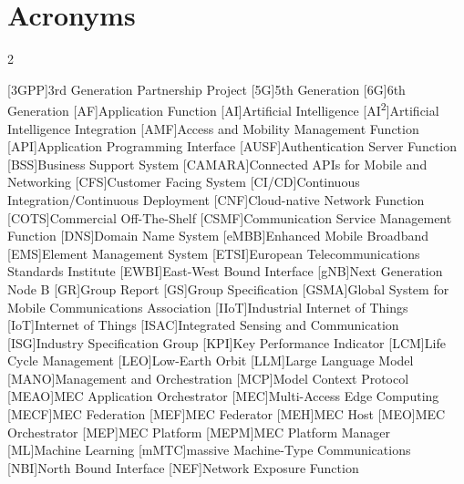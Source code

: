 \chapter{Acronyms}

\footnotesize
\SingleSpacing

\begin{multicols}{2}
\begin{acronym}[AAAAAA] %

	[3GPP]{3rd Generation Partnership Project}
	[5G]{5th Generation}
	[6G]{6th Generation}
	[AF]{Application Function}
	[AI]{Artificial Intelligence}
	[AI\textsuperscript{2}]{Artificial Intelligence Integration}
	[AMF]{Access and Mobility Management Function}
	[API]{Application Programming Interface}
	[AUSF]{Authentication Server Function}
	[BSS]{Business Support System}
	[CAMARA]{Connected APIs for Mobile and Networking}
	[CFS]{Customer Facing System}
	[CI/CD]{Continuous Integration/Continuous Deployment}
	[CNF]{Cloud-native Network Function}
	[COTS]{Commercial Off-The-Shelf}
	[CSMF]{Communication Service Management Function}
	[DNS]{Domain Name System}
	[eMBB]{Enhanced Mobile Broadband}
	[EMS]{Element Management System}
	[ETSI]{European Telecommunications Standards Institute}
	[EWBI]{East-West Bound Interface}
	[gNB]{Next Generation Node B}
	[GR]{Group Report}
	[GS]{Group Specification}
	[GSMA]{Global System for Mobile Communications Association}
	[IIoT]{Industrial Internet of Things}
	[IoT]{Internet of Things}
	[ISAC]{Integrated Sensing and Communication}
	[ISG]{Industry Specification Group}
	[KPI]{Key Performance Indicator}
	[LCM]{Life Cycle Management}
	[LEO]{Low-Earth Orbit}
	[LLM]{Large Language Model}
	[MANO]{Management and Orchestration}
	[MCP]{Model Context Protocol}
	[MEAO]{MEC Application Orchestrator}
	[MEC]{Multi-Access Edge Computing}
	[MECF]{MEC Federation}
	[MEF]{MEC Federator}
	[MEH]{MEC Host}
	[MEO]{MEC Orchestrator}
	[MEP]{MEC Platform}
	[MEPM]{MEC Platform Manager}
	[ML]{Machine Learning}
	[mMTC]{massive Machine-Type Communications}
	[NBI]{North Bound Interface}
	[NEF]{Network Exposure Function}

\end{acronym}
\end{multicols}
